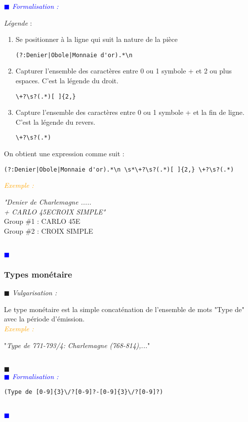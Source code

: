 \documentclass[a4paper, 11pt]{book}
\newenvironment{vulgarisation}
    {
    \textit{\textcolor{dark-blue}{$\blacksquare$  Vulgarisation : \\}}

    }
    {
    ~\\\textcolor{dark-blue}{$\blacksquare$}\\
    }
\newenvironment{formalisation}
    {
    \textit{\textcolor{blue}{$\blacksquare$  Formalisation : \\}}
    }
    {
    ~\\\textcolor{blue}{$\blacksquare$}\\
    }
\newenvironment{exemple}
    {
    \textit{\textcolor{orange}{
    Exemple : \\}}
    }
    {\\
    }
\begin{document}
\begin{formalisation}
	\textit{Légende} :
	\begin{enumerate}
		\item Se positionner à la ligne qui suit la nature de la pièce
		      \begin{verbatim}
(?:Denier|Obole|Monnaie d'or).*\n
		\end{verbatim}
		\item Capturer l'ensemble des caractères entre 0 ou 1 symbole + et 2 ou plus espaces. C'est la légende du droit.
		      \begin{verbatim}
\+?\s?(.*)[ ]{2,}
		\end{verbatim}
		\item Capture l'ensemble des caractères entre 0 ou 1 symbole + et la fin de ligne. C'est la légende du revers.
		      \begin{verbatim}
\+?\s?(.*)
		\end{verbatim}
	\end{enumerate}
	
	On obtient une expression comme suit : 
	\begin{verbatim}
(?:Denier|Obole|Monnaie d'or).*\n \s*\+?\s?(.*)[ ]{2,} \+?\s?(.*)
	\end{verbatim}
	
	\begin{exemple}
		\emph{"Denier de Charlemagne ..... \\+ CARLO  45E\indent\indent CROIX SIMPLE"}\\
		Group \#1 : CARLO  45E \\
		Group \#2 : CROIX SIMPLE
	\end{exemple}
\end{formalisation}

\subsubsection{Types monétaire}
\begin{vulgarisation}
	Le type monétaire est la simple concaténation de l'ensemble de mots "Type de" avec la période d'émission.\\
	\begin{exemple}
		"\emph{Type de 771-793/4: Charlemagne (768-814),...}"
	\end{exemple}
\end{vulgarisation}
\begin{formalisation}
	\begin{verbatim}
(Type de [0-9]{3}\/?[0-9]?-[0-9]{3}\/?[0-9]?)
	\end{verbatim}
\end{formalisation}
\end{document}
